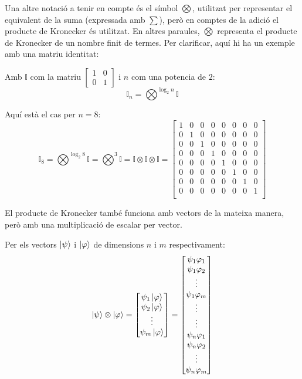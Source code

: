 Una altre notació a tenir en compte és el símbol $\bigotimes$, utilitzat per representar el equivalent de la suma (expressada amb $\sum$), però en comptes de la adició el producte de Kronecker és utilitzat. En altres paraules, $\bigotimes$ representa el producte de Kronecker de un nombre finit de termes. Per clarificar, aquí hi ha un exemple amb una matriu identitat: 

Amb $\mathbb{I}$ com la matriu $\begin{bmatrix} 1 & 0 \\ 0 & 1 \end{bmatrix}$ i $n$ com una potencia de $2$:
$$
\mathbb{I}_n = \bigotimes^{\log_{2} n} \mathbb{I}  
$$
	
Aquí està el cas per $n=8$: 
$$\mathbb{I}_8 =  \bigotimes^{\log_{2} 8} \mathbb{I} =\bigotimes^3 \mathbb{I} = \mathbb{I} \otimes \mathbb{I} \otimes \mathbb{I} =
	\begin{bmatrix}
		1 &0 &0 &0 &0 &0 &0 &0 \\
		0 &1 &0 &0 &0 &0 &0 &0 \\
		0 &0 &1 &0 &0 &0 &0 &0 \\
		0 &0 &0 &1 &0 &0 &0 &0 \\
		0 &0 &0 &0 &1 &0 &0 &0 \\
		0 &0 &0 &0 &0 &1 &0 &0 \\
		0 &0 &0 &0 &0 &0 &1 &0 \\
		0 &0 &0 &0 &0 &0 &0 &1 \\
	\end{bmatrix} 
$$

El producte de Kronecker també funciona amb vectors de la mateixa manera, però amb una multiplicació de escalar per vector.

Per els vectors $\ket{\psi}$ i $\ket{\varphi}$ de dimensions $n$ i $m$ respectivament:
$$
\ket{\psi} \otimes \ket{\varphi} = \begin{bmatrix}
	\psi_{1} \ket{\varphi} \\
	\psi_2 \ket{\varphi} \\
	\vdots \\
	\psi_{m} \ket{\varphi}
\end{bmatrix} = 
\begin{bmatrix}
\psi_{1} \varphi_1 \\
\psi_{1} \varphi_{2} \\
\vdots \\
\psi_{1} \varphi_{m} \\
\vdots \\
\vdots \\
\psi_{n} \varphi_1 \\
\psi_{n} \varphi_{2} \\
\vdots \\
\psi_{n} \varphi_{m} \\
\end{bmatrix}
$$

